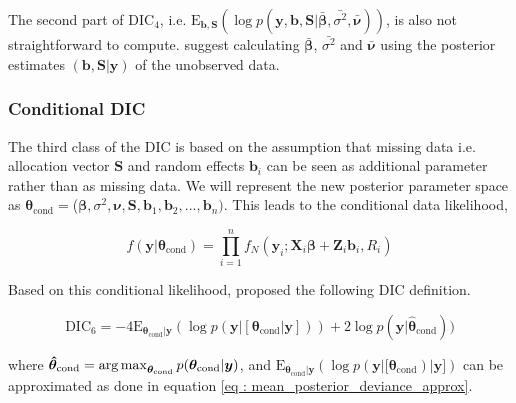 The second part of $\text{DIC}_4$, i.e. $\text{E}_{\boldsymbol{b},\boldsymbol{S}}(\log{p(\boldsymbol{y}, \boldsymbol{b}, \boldsymbol{S}|\boldsymbol{\bar{\beta}}, \bar{\sigma^2}, \boldsymbol{\bar{\nu}})})$, is also not straightforward to compute. \citet{celeux_deviance_2006} suggest calculating $\boldsymbol{\bar{\beta}}$, $\bar{\sigma^2}$ and $\boldsymbol{\bar{\nu}}$ using the posterior estimates $(\boldsymbol{b}, \boldsymbol{S} | \boldsymbol{y})$ of the unobserved data.

\subsubsection{Conditional DIC}
The third class of the DIC is based on the assumption that missing data i.e. allocation vector $\boldsymbol{S}$ and random effects $\boldsymbol{b}_i$ can be seen as additional parameter rather than as missing data. We will represent the new posterior parameter space as $\boldsymbol{\theta}_\text{cond} = $($\boldsymbol{\beta}, \sigma^2, \boldsymbol{\nu}, \boldsymbol{S}, \boldsymbol{b}_1, \boldsymbol{b}_2, ..., \boldsymbol{b}_n)$. This leads to the conditional data likelihood,

\begin{equation}
\label{eq : conditional_data_likelihood}
f(\boldsymbol{y}|\boldsymbol{\theta}_\text{cond}) = \prod_{i=1}^n f_N(\boldsymbol{y}_i; \boldsymbol{X}_i\boldsymbol{\beta} + \boldsymbol{Z}_i \boldsymbol{b}_i, R_i)
\end{equation}

Based on this conditional likelihood, \citet{celeux_deviance_2006} proposed the following DIC definition.

\begin{equation}
\label{eq : DIC6}
\text{DIC}_6 = -4\text{E}_{\boldsymbol{\theta}_\text{cond}|\boldsymbol{y}} (\log{p(\boldsymbol{y}|[\boldsymbol{\theta}_{\text{cond}}|\boldsymbol{y}])}) + 2\log{p(\boldsymbol{y}|\boldsymbol{\hat{\theta}}_\text{cond})})
\end{equation}

where
$\boldsymbol{\hat{\theta}}_\text{cond} = \operatorname*{arg\,max}_{\boldsymbol{\theta}_\text{cond}}p(\boldsymbol{\theta}_\text{cond}|\boldsymbol{y})$, and $\text{E}_{\boldsymbol{\theta}_\text{cond}|\boldsymbol{y}} (\log{p(\boldsymbol{y}|[\boldsymbol{\theta}_{\text{cond}})}|\boldsymbol{y}])$ can be approximated as done in equation \ref{eq : mean_posterior_deviance_approx}.